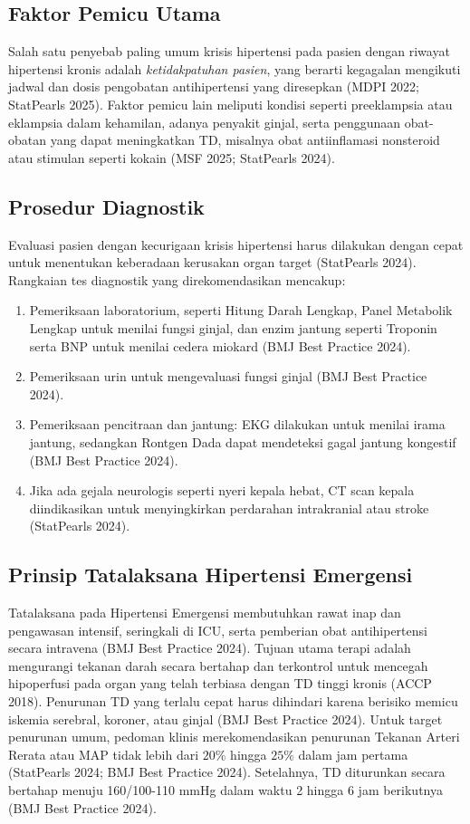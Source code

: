 \subsection{Faktor Pemicu Utama}
Salah satu penyebab paling umum krisis hipertensi pada pasien dengan riwayat hipertensi kronis adalah \textit{ketidakpatuhan pasien}, yang berarti kegagalan mengikuti jadwal dan dosis pengobatan antihipertensi yang diresepkan (MDPI 2022; StatPearls 2025). Faktor pemicu lain meliputi kondisi seperti preeklampsia atau eklampsia dalam kehamilan, adanya penyakit ginjal, serta penggunaan obat-obatan yang dapat meningkatkan TD, misalnya obat antiinflamasi nonsteroid atau stimulan seperti kokain (MSF 2025; StatPearls 2024).

\subsection{Prosedur Diagnostik}
Evaluasi pasien dengan kecurigaan krisis hipertensi harus dilakukan dengan cepat untuk menentukan keberadaan kerusakan organ target (StatPearls 2024).
Rangkaian tes diagnostik yang direkomendasikan mencakup:
\begin{enumerate}
    \item Pemeriksaan laboratorium, seperti Hitung Darah Lengkap, Panel Metabolik Lengkap untuk menilai fungsi ginjal, dan enzim jantung seperti Troponin serta BNP untuk menilai cedera miokard (BMJ Best Practice 2024).
    \item Pemeriksaan urin untuk mengevaluasi fungsi ginjal (BMJ Best Practice 2024).
    \item Pemeriksaan pencitraan dan jantung: EKG dilakukan untuk menilai irama jantung, sedangkan Rontgen Dada dapat mendeteksi gagal jantung kongestif (BMJ Best Practice 2024).
    \item Jika ada gejala neurologis seperti nyeri kepala hebat, CT scan kepala diindikasikan untuk menyingkirkan perdarahan intrakranial atau stroke (StatPearls 2024).
\end{enumerate}

\subsection{Prinsip Tatalaksana Hipertensi Emergensi}
Tatalaksana pada Hipertensi Emergensi membutuhkan rawat inap dan pengawasan intensif, seringkali di ICU, serta pemberian obat antihipertensi secara intravena (BMJ Best Practice 2024). Tujuan utama terapi adalah mengurangi tekanan darah secara bertahap dan terkontrol untuk mencegah hipoperfusi pada organ yang telah terbiasa dengan TD tinggi kronis (ACCP 2018). Penurunan TD yang terlalu cepat harus dihindari karena berisiko memicu iskemia serebral, koroner, atau ginjal (BMJ Best Practice 2024). Untuk target penurunan umum, pedoman klinis merekomendasikan penurunan Tekanan Arteri Rerata atau MAP tidak lebih dari $20\%$ hingga $25\%$ dalam jam pertama (StatPearls 2024; BMJ Best Practice 2024). Setelahnya, TD diturunkan secara bertahap menuju 160/100-110 mmHg dalam waktu 2 hingga 6 jam berikutnya (BMJ Best Practice 2024).

